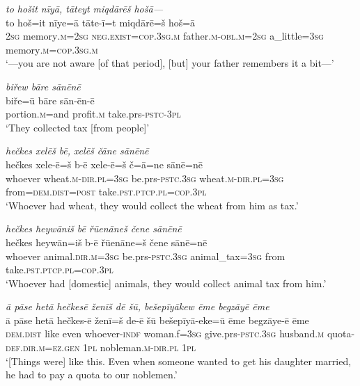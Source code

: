 \ea \label{BP.13}
\textit{to hošit nīyā, tāteyt miqdārēš hošā—} \\ 
\gll to hoš=it nīye=ā tāte-ī=t miqdārē=š hoš=ā \\ 
 \textsc{2sg} memory\textsc{.m}\textsc{=\textsc{2sg}} \textsc{\textsc{neg.}exist}\textsc{=cop}\textsc{.3sg}\textsc{.m} father\textsc{.m}\textsc{-obl}\textsc{.m}\textsc{=\textsc{2sg}} a\_little\textsc{=3sg} memory\textsc{.m}\textsc{=cop}\textsc{.3sg}\textsc{.m} \\ 
\glt `—you are not aware [of that period], [but] your father remembers it a bit—'
\z 
 
\ea \label{BP.14}
\textit{biřew bāre sānēnē} \\ 
\gll biře=ū bāre sān-ēn-ē \\ 
 portion\textsc{.m}=and profit\textsc{.m} take.prs\textsc{-pstc}\textsc{-3pl} \\ 
\glt `They collected tax [from people]'
\z 
 
\ea \label{BP.15}
\textit{hečkes xelēš bē, xelēš čāne sānēnē} \\ 
\gll hečkes xele-ē=š b-ē xele-ē=š č=ā=ne sānē=nē \\ 
 whoever wheat\textsc{.m}\textsc{-dir}\textsc{.pl}\textsc{=3sg} be.prs\textsc{-pstc}\textsc{.3sg} wheat\textsc{.m}\textsc{-dir}\textsc{.pl}\textsc{=3sg} from=\textsc{dem.dist}\textsc{=\textsc{post}} take\textsc{.pst}\textsc{.ptcp}\textsc{.pl}\textsc{=cop}\textsc{.3pl} \\ 
\glt `Whoever had wheat, they would collect the wheat from him as tax.'
\z 
 
\ea \label{BP.16}
\textit{hečkes ħeywāniš bē řūenāneš čene sānēnē} \\ 
\gll hečkes ħeywān=iš b-ē řūenāne=š čene sānē=nē \\ 
 whoever animal\textsc{.dir}\textsc{.m}\textsc{=3sg} be.prs\textsc{-pstc}\textsc{.3sg} animal\_tax\textsc{=3sg} from take\textsc{.pst}\textsc{.ptcp}\textsc{.pl}\textsc{=cop}\textsc{.3pl} \\ 
\glt `Whoever had [domestic] animals, they would collect animal tax from him.'
\z 
 
\ea \label{BP.17}
\textit{ā pāse hetā hečkesē ženīš dē šū, bešepīyākew ēme begzāyē ēme} \\ 
\gll ā pāse hetā hečkes-ē ženī=š de-ē šū bešepīyā-eke=ū ēme begzāye-ē ēme \\ 
 \textsc{dem.dist} like even whoever\textsc{-indf} woman.f\textsc{=3sg} give.prs\textsc{-pstc}\textsc{.3sg} husband\textsc{.m} quota\textsc{-def}\textsc{.dir}\textsc{.m}\textsc{=ez.gen} \textsc{1pl} nobleman\textsc{.m}\textsc{-dir}\textsc{.pl} \textsc{1pl} \\ 
\glt `[Things were] like this. Even when someone wanted to get his daughter married, he had to pay a quota  to our noblemen.'
\z 
 
